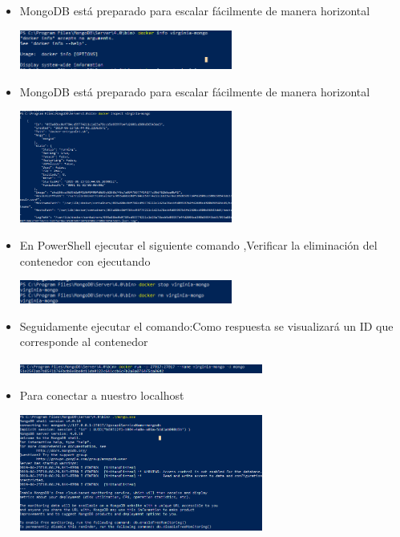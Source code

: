 \documentclass[%
 reprint,
 amsmath,amssymb,
 aps,
]{revtex4-1}
\begin{document}
\begin{itemize}
\begin{center}
		\end{center}	
                    \item MongoDB está preparado para escalar fácilmente de manera horizontal
                     \begin{center}
		\includegraphics[width=7cm]{./Imagenes/21}
		\end{center}
                     \item MongoDB está preparado para escalar fácilmente de manera horizontal
                     \begin{center}
		\includegraphics[width=7cm]{./Imagenes/22}
		\end{center}
                     \item En PowerShell ejecutar el siguiente comando ,Verificar la eliminación del contenedor con ejecutando
                     \begin{center}
		\includegraphics[width=7cm]{./Imagenes/23}
		\end{center}	
                      \item  Seguidamente ejecutar el comando:Como respuesta se visualizará un ID que corresponde al contenedor
                     \begin{center}
		\includegraphics[width=8cm]{./Imagenes/24}
		\end{center}	
                     \item Para conectar  a nuestro localhost 
                     \begin{center}
		\includegraphics[width=8cm]{./Imagenes/25}
		\end{center}		
	          \end{itemize}
\end{document}
